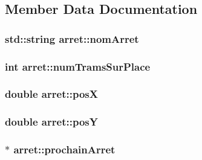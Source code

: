 \subsection{Member Data Documentation}
\subsubsection[{\texorpdfstring{nom\+Arret}{nomArret}}]{\setlength{\rightskip}{0pt plus 5cm}std\+::string arret\+::nom\+Arret}\hypertarget{classarret_a543d7100f999b9f0267945bf44c67d4b}{}\label{classarret_a543d7100f999b9f0267945bf44c67d4b}
\subsubsection[{\texorpdfstring{num\+Trams\+Sur\+Place}{numTramsSurPlace}}]{\setlength{\rightskip}{0pt plus 5cm}int arret\+::num\+Trams\+Sur\+Place}\hypertarget{classarret_aff9a2ea0c2261ea5ea0c04e5b84880bb}{}\label{classarret_aff9a2ea0c2261ea5ea0c04e5b84880bb}
\subsubsection[{\texorpdfstring{posX}{posX}}]{\setlength{\rightskip}{0pt plus 5cm}double arret\+::posX}\hypertarget{classarret_a10d9c6ad4411da3b31072f04633745d1}{}\label{classarret_a10d9c6ad4411da3b31072f04633745d1}
\subsubsection[{\texorpdfstring{posY}{posY}}]{\setlength{\rightskip}{0pt plus 5cm}double arret\+::posY}\hypertarget{classarret_a87be7e932dbc73b03ba64969c1413faa}{}\label{classarret_a87be7e932dbc73b03ba64969c1413faa}
\subsubsection[{\texorpdfstring{prochain\+Arret}{prochainArret}}]{$\ast$ arret\+::prochain\+Arret}\hypertarget{classarret_a69ca61ad6399a414b15a2bcc1cc4a81c}{}\label{classarret_a69ca61ad6399a414b15a2bcc1cc4a81c}
